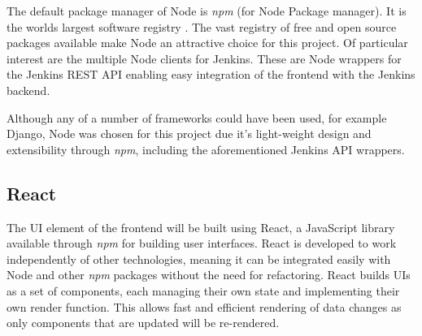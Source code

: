 The default package manager of Node is \textit{npm} (for Node Package manager). It is the worlds largest software registry \citep{npm}. The vast registry of free and open source packages available make Node an attractive choice for this project. Of particular interest are the multiple Node clients for Jenkins. These are Node wrappers for the Jenkins REST API enabling easy integration of the frontend with the Jenkins backend.

Although any of a number of frameworks could have been used, for example Django, Node was chosen for this project due it's light-weight design and extensibility through \textit{npm}, including the aforementioned Jenkins API wrappers.
 
\subsection{React}
The UI element of the frontend will be built using React, a JavaScript library available through \textit{npm} for building user interfaces. React is developed to work independently of other technologies, meaning it can be integrated easily with Node and other \textit{npm} packages without the need for refactoring. React builds UIs as a set of components, each managing their own state and implementing their own render function. This allows fast and efficient rendering of data changes as only components that are updated will be re-rendered.

